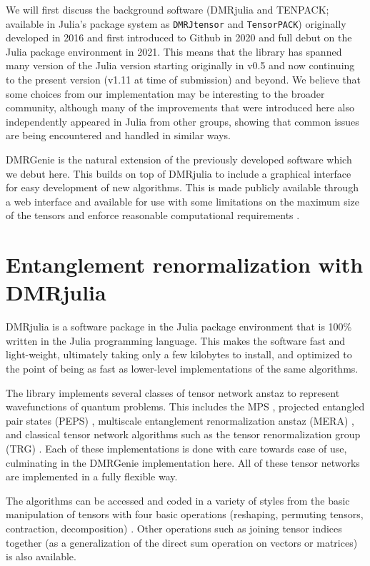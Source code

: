 \documentclass{juliacon}
\begin{document}
We will first discuss the background software (DMRjulia and TENPACK; available in Julia's package system as {\tt DMRJtensor} and {\tt TensorPACK}) originally developed in 2016 and first introduced to Github in 2020 and full debut on the Julia package environment in 2021. This means that the library has spanned many version of the Julia version starting originally in v0.5 and now continuing to the present version (v1.11 at time of submission) and beyond. We believe that some choices from our implementation may be interesting to the broader community, although many of the improvements that were introduced here also independently appeared in Julia from other groups, showing that common issues are being encountered and handled in similar ways.

DMRGenie is the natural extension of the previously developed software which we debut here. This builds on top of DMRjulia to include a graphical interface for easy development of new algorithms. This is made publicly available through a web interface and available for use with some limitations on the maximum size of the tensors and enforce reasonable computational requirements \cite{dmrgenie}.



\section{Entanglement renormalization with DMRjulia}

DMRjulia is a software package in the Julia package environment that is 100\% written in the Julia programming language. This makes the software fast and light-weight, ultimately taking only a few kilobytes to install, and optimized to the point of being as fast as lower-level implementations of the same algorithms.

The library implements several classes of tensor network anstaz to represent wavefunctions of quantum problems. This includes the MPS \cite{verstraete2006matrix,baker2024bundled}, projected entangled pair states (PEPS) \cite{verstraete2004renormalization}, multiscale entanglement renormalization anstaz (MERA) \cite{vidal2007entanglement}, and classical tensor network algorithms such as the tensor renormalization group (TRG) \cite{levin2007tensor}. Each of these implementations is done with care towards ease of use, culminating in the DMRGenie implementation here.  All of these tensor networks are implemented in a fully flexible way.

The algorithms can be accessed and coded in a variety of styles from the basic manipulation of tensors with four basic operations (reshaping, permuting tensors, contraction, decomposition) \cite{bakerCJP21,dmrjulia1}. Other operations such as joining tensor indices together (as a generalization of the direct sum operation on vectors or matrices) is also available. 
\end{document}
